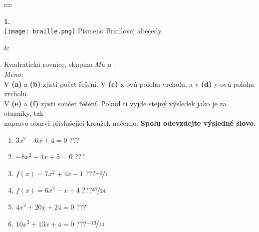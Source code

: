 \documentclass[10pt]{report}
\begin{document}
\begin{tabular}{c:c}
\begin{minipage}[c][99mm][t]{0.49\linewidth}
\begin{center}
\begin{minipage}{0.20\linewidth}
\begin{center}
{\Huge\bfseries 1.} \\[2mm]
\texttt{[image: braille.png]}
{\small Písmeno Braillovej abecedy}
\end{center}
\end{minipage}
\end{center}
\end{minipage}
&
\begin{minipage}[c][99mm][t]{0.49\linewidth}
\begin{center}
\vspace{7mm}
{\huge Kvadratická rovnice, skupina \textit{Mu $\mu$} -}\\[4.5mm]
\textit{Meno:}\phantom{xxxxxxxxxxxxxxxxxxxxxxxxxxxxxxxxxxxxxxxxxxxxxxxxxxxxxxxxxxxxxxxxx}\\[3.5mm]
V \textbf{(a)} a \textbf{(b)} zjisti počet řešení. V \textbf{(c)} x-ovú polohu vrcholu, a v \textbf{(d)} y-ovú polohu vrcholu.\\V \textbf{(e)} a \textbf{(f)} zjisti součet řešení. Pokud ti vyjde stejný výsledek jako je za otazníky, tak\\napravo obarvi příslušející kroužek načerno. \textbf{Spolu odevzdejte výsledné slovo}.\\[3mm]
\begin{minipage}{0.77\linewidth}
\begin{center}
\begin{varwidth}{\textwidth}
\begin{enumerate}
\large
\item $3x^2-6x+4=0$\quad \dotfill\; ???\;\dotfill {}
\item $-8x^2-4x+5=0$\quad \dotfill\; ???\;\dotfill {}
\item $f(x)=7x^2+4x-1$\quad \dotfill\; ???\;\dotfill \quad $\nicefrac{-2}{7}$
\item $f(x)=6x^2-x+4$\quad \dotfill\; ???\;\dotfill \quad $\nicefrac{47}{24}$
\item $4x^2+20x+24=0$\quad \dotfill\; ???\;\dotfill {}
\item $10x^2+13x+4=0$\quad \dotfill\; ???\;\dotfill \quad $\nicefrac{-13}{10}$
\end{enumerate}
\end{varwidth}
\end{center}
\end{minipage}
\begin{minipage}{0.20\linewidth}

\end{minipage}
\end{center}
\end{minipage}
\end{tabular}
\end{document}
